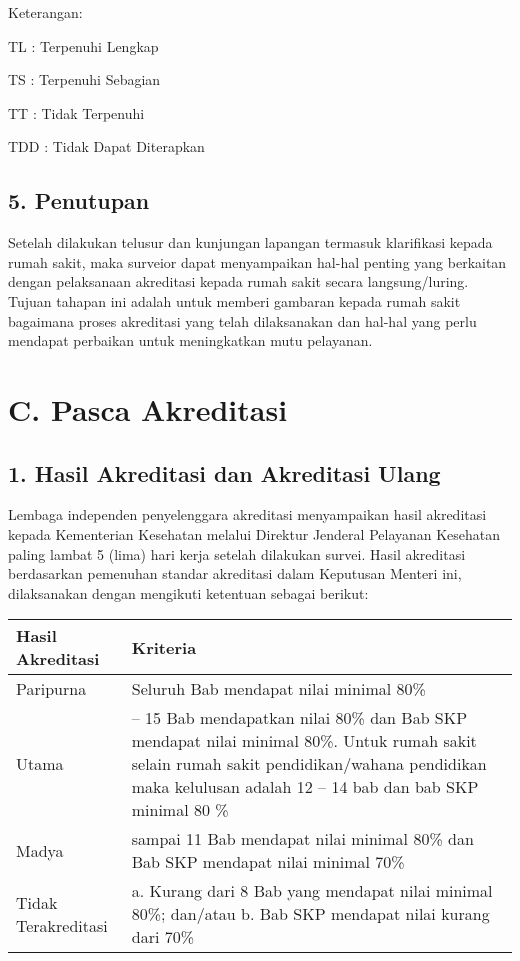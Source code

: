 \documentclass[
]{book}
\begin{document}
Keterangan:

TL : Terpenuhi Lengkap

TS : Terpenuhi Sebagian

TT : Tidak Terpenuhi

TDD : Tidak Dapat Diterapkan

\hypertarget{penutupan}{%
\subsection*{5. Penutupan}\label{penutupan}}

Setelah dilakukan telusur dan kunjungan lapangan termasuk klarifikasi kepada rumah sakit, maka surveior dapat menyampaikan hal-hal penting yang berkaitan dengan pelaksanaan akreditasi kepada rumah sakit secara langsung/luring. Tujuan tahapan ini adalah untuk memberi gambaran kepada rumah sakit bagaimana proses akreditasi yang telah dilaksanakan dan hal-hal yang perlu mendapat perbaikan untuk meningkatkan mutu pelayanan.

\hypertarget{c.-pasca-akreditasi}{%
\section*{C. Pasca Akreditasi}\label{c.-pasca-akreditasi}}

\hypertarget{hasil-akreditasi-dan-akreditasi-ulang}{%
\subsection*{1. Hasil Akreditasi dan Akreditasi Ulang}\label{hasil-akreditasi-dan-akreditasi-ulang}}

Lembaga independen penyelenggara akreditasi menyampaikan hasil akreditasi kepada Kementerian Kesehatan melalui Direktur Jenderal Pelayanan Kesehatan paling lambat 5 (lima) hari kerja setelah dilakukan survei. Hasil akreditasi berdasarkan pemenuhan standar akreditasi dalam Keputusan Menteri ini, dilaksanakan dengan mengikuti ketentuan sebagai berikut:

\begin{longtable}[]{@{}
  >{\raggedright\arraybackslash}p{}
  >{\raggedright\arraybackslash}p{}@{}}
\toprule
Hasil Akreditasi & Kriteria \\
\midrule
\endhead
Paripurna & Seluruh Bab mendapat nilai minimal 80\% \\
Utama & 12 -- 15 Bab mendapatkan nilai 80\% dan Bab SKP mendapat nilai minimal 80\%. Untuk rumah sakit selain rumah sakit pendidikan/wahana pendidikan maka kelulusan adalah 12 -- 14 bab dan bab SKP minimal 80 \% \\
Madya & 8 sampai 11 Bab mendapat nilai minimal 80\% dan Bab SKP mendapat nilai minimal 70\% \\
Tidak Terakreditasi & a. Kurang dari 8 Bab yang mendapat nilai minimal 80\%; dan/atau b. Bab SKP mendapat nilai kurang dari 70\% \\
\bottomrule
\end{longtable}
\end{document}
